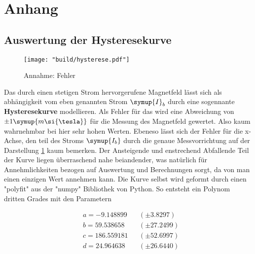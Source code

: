 \section{Anhang}
\label{sec:anhang}





\subsection{Auswertung der Hysteresekurve}
\label{sec:auswertung_hyst}

\begin{figure}
    \centering
    \texttt{[image: "build/hysterese.pdf"]}
    \caption{Annahme: Fehler }
    \label{fig:Bfeld}
 \end{figure}

 
 Das durch einen stetigen Strom hervorgerufene Magnetfeld lässt sich als abhängigkeit vom eben genannten Strom $\symup{I}_b$ durch eine sogennante \textbf{Hysteresekurve} modellieren.
 Als Fehler für das wird eine Abweichung von $\pm 1 \symup{m\si{\tesla}}$ für die Messung des Magnetfeld gewertet. Also kaum wahrnehmbar bei hier sehr hohen Werten. Ebeneso lässt sich der Fehler für die x-Achse, den teil des Stroms 
 $\symup{I_b}$ durch die genaue Messvorrichtung auf der Darstellung \ref{fig:Bfeld} kaum bemerken.
 Der Ansteigende und enstrechend Abfallende Teil der Kurve liegen überraschend nahe beiandender, was natürlich für Annehmlichkeiten bezogen auf Auswertung und Berechnungen sorgt, da von man einen einzigen Wert annehmen kann.
 Die Kurve selbst wird geformt durch einen "polyfit" aus der "numpy" Bibliothek von Python. So entsteht ein Polynom dritten Grades mit den Parametern 

\begin{align*}
&a = -9.148899 &&(\pm 3.8297) \\
&b = 59.538658 &&(\pm 27.2499) \\
&c = 186.559181 &&(\pm 52.6997) \\
&d = 24.964638 &&(\pm 26.6440 )
\end{align*}








\newpage